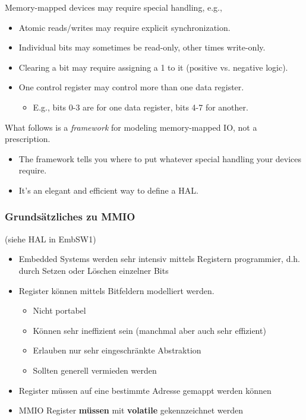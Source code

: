 Memory-mapped devices may require special handling, e.g.,
\begin{itemize}
  \item Atomic reads/writes may require explicit synchronization.
  \item Individual bits may sometimes be read-only, other times write-only.
  \item Clearing a bit may require assigning a 1 to it (positive vs. negative logic).
  \item One control register may control more than one data register.
  \begin{itemize}
    \item E.g., bits 0-3 are for one data register, bits 4-7 for another.
  \end{itemize}
\end{itemize}
What follows is a \textit{framework} for modeling memory-mapped IO, not a prescription.
\begin{itemize}
  \item The framework tells you where to put whatever special handling your devices require.
  \item It's an elegant and efficient way to define a HAL.
\end{itemize}

\subsubsection{Grundsätzliches zu MMIO}
(siehe HAL in EmbSW1)
\begin{itemize}
  \item Embedded Systems werden sehr intensiv mittels Registern programmier, d.h. durch Setzen oder Löschen einzelner Bits
  \item Register können mittels Bitfeldern modelliert werden.
  \begin{itemize}
    \item Nicht portabel
    \item Können sehr ineffizient sein (manchmal aber auch sehr effizient)
    \item Erlauben nur sehr eingeschränkte Abstraktion
    \item Sollten generell vermieden werden
  \end{itemize}
  \item Register müssen auf eine bestimmte Adresse gemappt werden können
  \item MMIO Register \textbf{müssen} mit \textbf{volatile} gekennzeichnet werden
\end{itemize}


